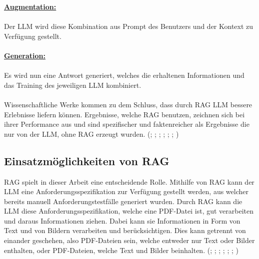 \documentclass[12pt,toc=bib,toc=listof]{scrreprt}
\begin{document}
\textbf{\underline{Augmentation:}}\\
\\
Der LLM wird diese Kombination aus Prompt des Benutzers und der Kontext zu Verfügung gestellt.\\
\\
\textbf{\underline{Generation:}}\\
\\
Es wird nun eine Antwort generiert, welches die erhaltenen Informationen und das Training des jeweiligen LLM kombiniert.\\
\\
Wissenschaftliche Werke kommen zu dem Schluss, dass durch RAG LLM bessere Erlebnisse liefern können. Ergebnisse, welche RAG benutzen, zeichnen sich bei ihrer Performance aus und sind spezifischer und faktenreicher als Ergebnisse die nur von der LLM, ohne RAG erzeugt wurden. (\cite{Gao2024}; \cite{Honroth2024}; \cite{Lewis2021}; \cite{Miesle2023}; \cite{Salemi2024}; \cite{Schmid2024}; \cite{Wu2024})

\subsection{Einsatzmöglichkeiten von RAG} %
\label{sec:einsatzmöglichkeitenVonRAG}
RAG spielt in dieser Arbeit eine entscheidende Rolle. Mithilfe von RAG kann der LLM eine Anforderungsspezifikation zur Verfügung gestellt werden, aus welcher bereits manuell Anforderungstestfälle generiert wurden. Durch RAG kann die LLM diese Anforderungsspezifikation, welche eine PDF-Datei ist, gut verarbeiten und daraus Informationen ziehen. Dabei kann sie Informationen in Form von Text und von Bildern verarbeiten und berücksichtigen. Dies kann getrennt von einander geschehen, also PDF-Dateien sein, welche entweder nur Text oder Bilder enthalten, oder PDF-Dateien, welche Text und Bilder beinhalten. (\cite{Gao2024}; \cite{Honroth2024}; \cite{Lewis2021}; \cite{Miesle2023}; \cite{Salemi2024}; \cite{Schmid2024}; \cite{Wu2024})
\end{document}

